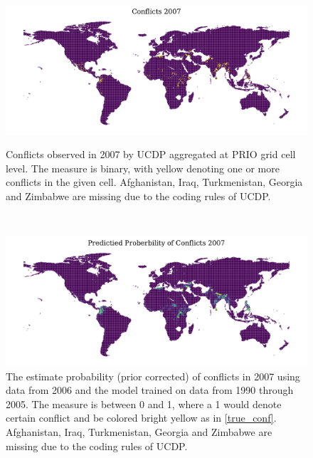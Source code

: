 \documentclass[a4paper]{article}
\begin{document}
\begin{figure}[!htb]%
  \centering
  \begin{minipage}[b]{1\textwidth}
    \includegraphics[width=\textwidth]{conflicts_2007.pdf}
    \caption{\footnotesize{Conflicts observed in 2007 by UCDP aggregated at PRIO grid cell level. The measure is binary, with yellow denoting one or more conflicts in the given cell. Afghanistan, Iraq, Turkmenistan, Georgia and Zimbabwe are missing due to the coding rules of UCDP.}}\label{true_conf}
  \end{minipage}
  \\	
  \begin{minipage}[b]{1\textwidth}
    \includegraphics[width=\textwidth]{pred_prob_conflicts_2007_bayes.pdf}
    \caption{\footnotesize{The estimate probability (prior corrected) of conflicts in 2007 using data from 2006 and the model trained on data from 1990 through 2005. The measure is between 0 and 1, where a 1 would denote certain conflict and be colored bright yellow as in \autoref{true_conf}. Afghanistan, Iraq, Turkmenistan, Georgia and Zimbabwe are missing due to the coding rules of UCDP.}}\label{pred_conf_b}
  \end{minipage}
\end{figure}
\end{document}
